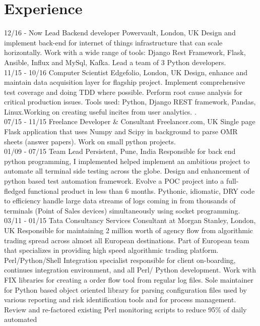 \documentclass[]{friggeri-cv}
\begin{document}
\section{Experience}
\begin{entrylist}
  \entry
    {12/16 - Now}
    {Lead Backend developer}
    {Powervault, London, UK}
    {Design and implement back-end for internet of things infrastructure that can scale horizontally. Work with a wide range of tools: Django Rest Framework, Flask, Ansible, Influx and MySql, Kafka. Lead a team of 3 Python developers. \\}
  \entry
    {11/15 - 10/16}
    {Computer Scientist}
    {Edgefolio, London, UK}
    {Design, enhance and maintain data acquisition layer for flagship project. Implement comprehensive test coverage and doing TDD where possible. Perform root cause analysis for critical production issues. Tools used: Python, Django REST framework, Pandas, Linux.Working on creating useful incites from user analytics.
    .\\}
    \entry
    {07/15 - 11/15}
    {Freelance Developer \& Consultant}
    {Freelancer.com, UK}
    {Single page Flask application that uses Numpy and Scipy in background to parse OMR sheets (answer papers). Work on small python projects.\\}
    \entry
    {01/09 - 07/15}
    {Team Lead}
    {Persistent, Pune, India}
    {Responsible for back end python programming, I implemented helped implement an ambitious project to automate all terminal side testing across the globe. Design and enhancement of python based test automation framework. Evolve a POC project into a full-fledged functional product in less than 6 months. Pythonic, idiomatic, DRY code to efficiency handle large data streams of logs coming in
    from thousands of terminals (Point of Sales devices) simultaneously using socket programming.\\}
    \entry
    {03/11 - 01/15}
    {Tata Consultancy Services}
    {Consultant at Morgan Stanley, London, UK}
    {Responsible for maintaining 2 million worth of agency flow from algorithmic trading spread across almost all European destinations. Part of European team that specializes in providing high speed algorithmic trading platform. Perl/Python/Shell Integration specialist responsible for client on-boarding, continues integration environment, and all Perl/ Python development. Work with FIX libraries for creating a order flow tool from regular log files. Sole maintainer for Python based object oriented library for parsing configuration files used by various reporting and risk identification tools and for process management. Review and re-factored existing Perl monitoring scripts to reduce 95\% of daily automated
}
\end{entrylist}
\end{document}
